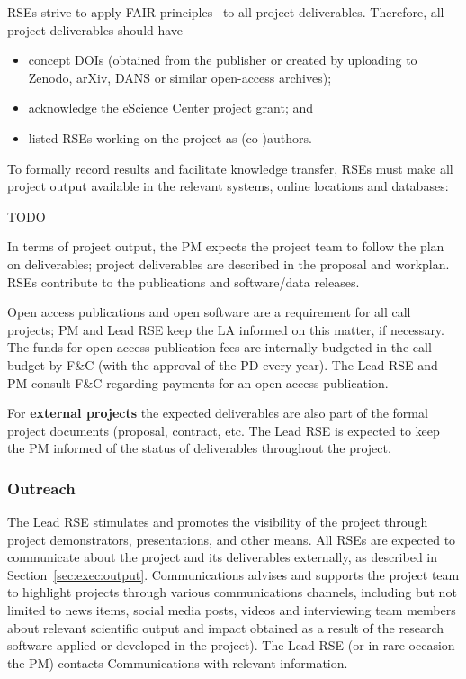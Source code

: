 \documentclass[11pt]{article}
\begin{document}
RSEs strive to apply FAIR principles~\cite{fair-principles,FAIR4RS} to all project deliverables. Therefore, all project deliverables should have

\begin{itemize}
\item concept DOIs (obtained from the publisher or created by uploading to Zenodo, arXiv, DANS or similar open-access
archives);
\item acknowledge the eScience Center project grant; and
\item listed RSEs working on the project as (co-)authors.
\end{itemize}

To formally record results and facilitate knowledge transfer, RSEs must make all project output available in the
relevant systems, online locations and databases:

TODO

In terms of project output, the PM expects the project team to follow the plan on deliverables; project deliverables are
described in the proposal and workplan. RSEs contribute to the publications and software/data releases.

Open access publications and open software are a requirement for all call projects; PM and Lead RSE keep the LA informed
on this matter, if necessary. The funds for open access publication fees are internally budgeted in the call budget by
F\&C (with the approval of the PD every year). The Lead RSE and PM consult F\&C regarding payments for an open access
publication.

For \textbf{external projects} the expected deliverables are also part of the formal project documents (proposal,
contract, etc. The Lead RSE is expected to keep the PM informed of the status of deliverables throughout the project.


\subsubsection{Outreach}
\label{sec:exec:outreach}
The Lead RSE stimulates and promotes the visibility of the project through project demonstrators, presentations, and
other means. All RSEs are expected to communicate about the project and its deliverables externally, as
described in Section~\ref{sec:exec:output}. Communications advises and supports the project team to
highlight projects through various communications channels, including but not limited to news items, social media
posts, videos and interviewing team members about relevant scientific output and impact obtained as a result of the
research software applied or developed in the project). The Lead RSE (or in rare occasion the PM) contacts
Communications with relevant information. 
\end{document}
